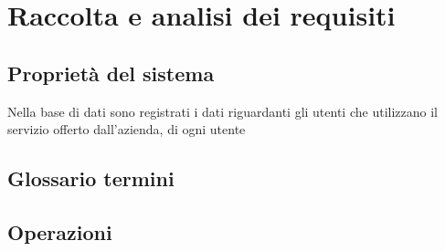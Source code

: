 \section{Raccolta e analisi dei requisiti}
\subsection{Proprietà del sistema}
Nella base di dati sono registrati i dati riguardanti gli utenti che utilizzano il servizio offerto dall'azienda, di ogni utente
\subsection{Glossario termini}
\subsection{Operazioni}